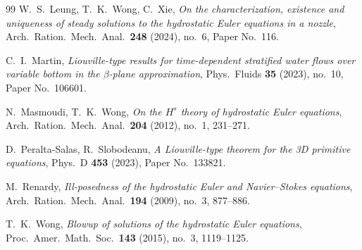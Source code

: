 \documentclass[11pt]{amsart}
\theoremstyle{definition}
\theoremstyle{remark}
\begin{document}
\begin{thebibliography}{99}
W.~S.~Leung, T.~K.~Wong, C.~Xie,
\emph{On the characterization, existence and uniqueness of steady
solutions to the hydrostatic Euler equations in a nozzle},
Arch.\ Ration.\ Mech.\ Anal.\ \textbf{248} (2024), no.~6,
Paper No.~116.

C.~I.~Martin,
\emph{Liouville-type results for time-dependent stratified water flows
over variable bottom in the $\beta$-plane approximation},
Phys.\ Fluids \textbf{35} (2023), no.~10, Paper No.~106601.

N.~Masmoudi, T.~K.~Wong,
\emph{On the $H^s$ theory of hydrostatic Euler equations},
Arch.\ Ration.\ Mech.\ Anal.\ \textbf{204} (2012), no.~1, 231--271.

D.~Peralta-Salas, R.~Slobodeanu,
\emph{A Liouville-type theorem for the 3D primitive equations},
Phys.\ D \textbf{453} (2023), Paper No.~133821.

M.~Renardy,
\emph{Ill-posedness of the hydrostatic Euler and Navier--Stokes
equations}, Arch.\ Ration.\ Mech.\ Anal.\ \textbf{194} (2009), no.~3,
877--886.

T.~K.~Wong,
\emph{Blowup of solutions of the hydrostatic Euler equations},
Proc.\ Amer.\ Math.\ Soc.\ \textbf{143} (2015), no.~3, 1119--1125.

\end{thebibliography}
\end{document}
